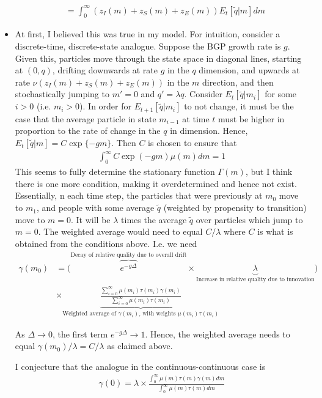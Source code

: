 \documentclass[12pt,english]{article}
\theoremstyle{remark}
\begin{document}
\begin{itemize}
\begin{align*}
		       &= \int_0^{\infty} (z_I(m) + z_S(m) + z_E(m)) E_t[\tilde{q} | m] dm
	\end{align*}
	\item At first, I believed this was true in my model. For intuition, consider a discrete-time, discrete-state analogue. Suppose the BGP growth rate is $g$. Given this, particles move through the state space in diagonal lines, starting at $(0,q)$, drifting downwards at rate $g$ in the $q$ dimension, and upwards at rate $\nu(z_I(m) + z_S(m) + z_E(m))$ in the $m$ direction, and then stochastically jumping to $m' = 0$ and $q' = \lambda q$. Consider $E_t[\tilde{q}|m_i]$ for some $i > 0$ (i.e. $m_i > 0$). In order for $E_{t+1}[\tilde{q}|m_i]$ to not change, it must be the case that the average particle in state $m_{i-1}$ at time $t$ must be higher in proportion to the rate of change in the $q$ in dimension. Hence, $E_t[\tilde{q} | m] = C\exp\{ -gm \} $. Then $C$ is chosen to ensure that \begin{align}
		\int_0^{\infty} C\exp(-gm) \mu(m) dm = 1
	\end{align}
	This seems to fully determine the stationary function $\Gamma(m)$, but I think there is one more condition, making it overdetermined and hence not exist. Essentially, n each time step, the particles that were previously at $m_0$ move to $m_1$, and people with some average $\tilde{q}$ (weighted by propensity to transition) move to $m=0$. It will be $\lambda$ times the average $\tilde{q}$ over particles which jump to $m=0$. The weighted average would need to equal $C/\lambda$ where $C$ is what is obtained from the conditions above.  I.e. we need 
	\begin{align*}
		\gamma (m_0) &= \Bigg(\overbrace{e^{-g\Delta}}^{\text{Decay of relative quality due to overall drift}} \times \underbrace{\lambda }_{\text{Increase in relative quality due to innovation}} \Bigg) \\
		&\times
		\underbrace{\frac{\sum_{i=0}^{\infty} \mu(m_i) \tau(m_i) \gamma(m_i)}{\sum_{i=0}^{\infty}\mu(m_i)\tau(m_i)}}_{\text{Weighted average of $\gamma(m_i)$, with weights $\mu(m_i)\tau(m_i)$}}
	\end{align*}
	
	As $\Delta \to 0$, the first term $e^{-g\Delta} \to 1$. Hence, the weighted average needs to equal $\gamma(m_0) / \lambda = C / \lambda$ as claimed above. 
	
	I conjecture that the analogue in the continuous-continuous case is 
	\begin{align*}
		\gamma(0) = \lambda \times \frac{\int_0^{\infty} \mu(m)\tau(m)\gamma(m)dm}{\int_0^{\infty}\mu(m) \tau(m) dm}
	\end{align*}
	

\end{itemize}
\end{document}

